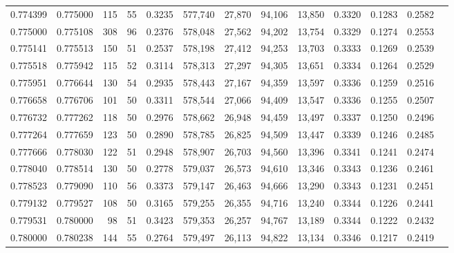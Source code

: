 \begin{tabular}{rrrrrrrrrrrrr}
0.774399 & 0.775000 &    115 &    55 &                                     0.3235 & 577,740 &  27,870 &  94,106 &  13,850 & 0.3320 & 0.1283 & 0.2582 \\
0.775000 & 0.775108 &    308 &    96 &                                     0.2376 & 578,048 &  27,562 &  94,202 &  13,754 & 0.3329 & 0.1274 & 0.2553 \\
0.775141 & 0.775513 &    150 &    51 &                                     0.2537 & 578,198 &  27,412 &  94,253 &  13,703 & 0.3333 & 0.1269 & 0.2539 \\
0.775518 & 0.775942 &    115 &    52 &                                     0.3114 & 578,313 &  27,297 &  94,305 &  13,651 & 0.3334 & 0.1264 & 0.2529 \\
0.775951 & 0.776644 &    130 &    54 &                                     0.2935 & 578,443 &  27,167 &  94,359 &  13,597 & 0.3336 & 0.1259 & 0.2516 \\
0.776658 & 0.776706 &    101 &    50 &                                     0.3311 & 578,544 &  27,066 &  94,409 &  13,547 & 0.3336 & 0.1255 & 0.2507 \\
0.776732 & 0.777262 &    118 &    50 &                                     0.2976 & 578,662 &  26,948 &  94,459 &  13,497 & 0.3337 & 0.1250 & 0.2496 \\
0.777264 & 0.777659 &    123 &    50 &                                     0.2890 & 578,785 &  26,825 &  94,509 &  13,447 & 0.3339 & 0.1246 & 0.2485 \\
0.777666 & 0.778030 &    122 &    51 &                                     0.2948 & 578,907 &  26,703 &  94,560 &  13,396 & 0.3341 & 0.1241 & 0.2474 \\
0.778040 & 0.778514 &    130 &    50 &                                     0.2778 & 579,037 &  26,573 &  94,610 &  13,346 & 0.3343 & 0.1236 & 0.2461 \\
0.778523 & 0.779090 &    110 &    56 &                                     0.3373 & 579,147 &  26,463 &  94,666 &  13,290 & 0.3343 & 0.1231 & 0.2451 \\
0.779132 & 0.779527 &    108 &    50 &                                     0.3165 & 579,255 &  26,355 &  94,716 &  13,240 & 0.3344 & 0.1226 & 0.2441 \\
0.779531 & 0.780000 &     98 &    51 &                                     0.3423 & 579,353 &  26,257 &  94,767 &  13,189 & 0.3344 & 0.1222 & 0.2432 \\
0.780000 & 0.780238 &    144 &    55 &                                     0.2764 & 579,497 &  26,113 &  94,822 &  13,134 & 0.3346 & 0.1217 & 0.2419 \\

\end{tabular}
